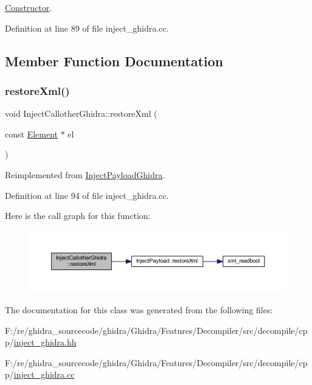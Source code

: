 \mbox{\hyperlink{class_constructor}{Constructor}}. 



Definition at line 89 of file inject\+\_\+ghidra.\+cc.



\subsection{Member Function Documentation}
\mbox{\label{class_inject_callother_ghidra_a2b2c94c0e13627b5b0eeaa54d52aaeee}} 
\subsubsection{\texorpdfstring{restoreXml()}{restoreXml()}}
{\footnotesize\ttfamily void Inject\+Callother\+Ghidra\+::restore\+Xml (\begin{DoxyParamCaption}\item[{const \mbox{\hyperlink{class_element}{Element}} $\ast$}]{el }\end{DoxyParamCaption})\hspace{0.3cm}{\ttfamily [virtual]}}



Reimplemented from \mbox{\hyperlink{class_inject_payload_ghidra_a5ccd974310decec0bdb6985f89c0f0ed}{Inject\+Payload\+Ghidra}}.



Definition at line 94 of file inject\+\_\+ghidra.\+cc.

Here is the call graph for this function\+:
\nopagebreak
\begin{figure}[H]
\begin{center}
\leavevmode
\includegraphics[width=350pt]{class_inject_callother_ghidra_a2b2c94c0e13627b5b0eeaa54d52aaeee_cgraph}
\end{center}
\end{figure}


The documentation for this class was generated from the following files\+:\begin{DoxyCompactItemize}
\item 
F\+:/re/ghidra\+\_\+sourcecode/ghidra/\+Ghidra/\+Features/\+Decompiler/src/decompile/cpp/\mbox{\hyperlink{inject__ghidra_8hh}{inject\+\_\+ghidra.\+hh}}\item 
F\+:/re/ghidra\+\_\+sourcecode/ghidra/\+Ghidra/\+Features/\+Decompiler/src/decompile/cpp/\mbox{\hyperlink{inject__ghidra_8cc}{inject\+\_\+ghidra.\+cc}}\end{DoxyCompactItemize}

